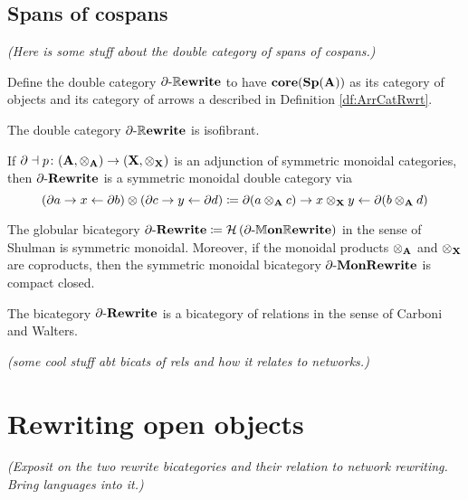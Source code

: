 \documentclass{amsart}
\begin{document}
\subsection{Spans of cospans}

\emph{(Here is some stuff about the double category of spans of cospans.)}

\begin{df}
	Define the double category $ \partial \text{-} \mathbb{R}\mathbf{ewrite} $ to have $ \mathbf{core}(\mathbf{Sp}(\mathbf{A})) $ as its category of objects and its category of arrows a described in Definition \ref{df:ArrCatRwrt}.
\end{df}

\begin{thm}
	The double category $ \partial \text{-} \mathbb{R}\mathbf{ewrite} $ is isofibrant.
\end{thm}

\begin{thm}
	If $ \partial \dashv p \colon (\mathbf{A}, \otimes_{\mathbf{A}}) \to (\mathbf{X}, \otimes_{\mathbf{X}}) $ is an adjunction of symmetric monoidal categories, then $ \partial \text{-} \mathbf{Rewrite} $ is a symmetric monoidal double category via
	\[
	\left( \partial a \to x \gets \partial b \right) \otimes
	\left( \partial c \to y \gets \partial d	\right) \coloneqq
	\partial (a \otimes_{\mathbf{A}} c) \to 
	x \otimes_{\mathbf{X}} y \gets \partial (b \otimes_{\mathbf{A}} d)
	\]
\end{thm}

\begin{thm}
	The globular bicategory $ \partial \text{-} \mathbf{Rewrite} \coloneqq  \mathcal{H} \left( \partial \text{-} \mathbb{M}\mathbf{on}\mathbb{R}\mathbf{ewrite} \right) $ in the sense of Shulman is symmetric monoidal.  Moreover, if the monoidal products $ \otimes_{\mathbf{A}} $ and $ \otimes_{\mathbf{X}} $ are coproducts, then the symmetric monoidal bicategory $ \partial \text{-} \mathbf{MonRewrite} $ is compact closed.
\end{thm}

\begin{thm}
	The bicategory $ \partial \text{-} \mathbf{Rewrite} $ is a bicategory of relations in the sense of Carboni and Walters.
\end{thm}
 
 \emph{(some cool stuff abt bicats of rels and how it relates to networks.)}
 
 \section{Rewriting open objects}
 
 \emph{(Exposit on the two rewrite bicategories and their relation to network rewriting.  Bring languages into it.)}
 
\end{document}
